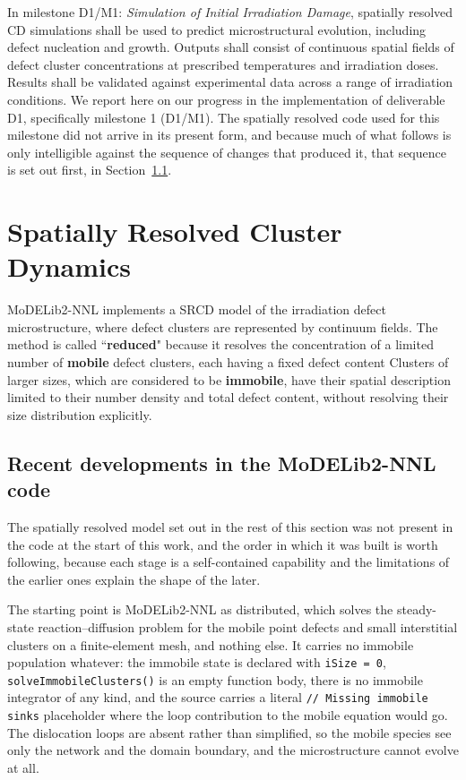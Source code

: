 \documentclass{article}
\newcommand{\MoD}{\textsf{MoDELib2-NNL}}
\begin{document}
In milestone D1/M1: \emph{Simulation of Initial Irradiation Damage}, spatially resolved CD simulations
shall be used to predict microstructural evolution, including defect nucleation and growth.
Outputs shall consist of continuous spatial fields of defect cluster concentrations at prescribed
temperatures and irradiation doses. Results shall be validated against experimental data across a
range of irradiation conditions.
We report here on our progress in the implementation of deliverable D1, specifically milestone 1 (D1/M1). The spatially resolved code used for this milestone did not arrive in its present form, and because much of what follows is only intelligible against the sequence of changes that produced it, that sequence is set out first, in Section~\ref{sec:modelib_history}.


\section{Spatially Resolved Cluster Dynamics}
\label{sec:SRCD}

{\MoD} implements a SRCD model of  the irradiation defect microstructure, where defect clusters are represented by continuum fields. The method is called ``\textbf{reduced}" because it resolves the concentration of a limited number of \textbf{mobile} defect clusters, each having a fixed defect content Clusters of larger sizes, which are considered to be \textbf{immobile}, have their spatial description limited to their number density and total defect content, without resolving their size distribution explicitly.

\subsection{Recent developments in the {\MoD} code}
\label{sec:modelib_history}

The spatially resolved model set out in the rest of this section was not present
in the code at the start of this work, and the order in which it was built is
worth following, because each stage is a self-contained capability and the
limitations of the earlier ones explain the shape of the later.

The starting point is {\MoD} as distributed, which solves the steady-state
reaction--diffusion problem for the mobile point defects and small interstitial
clusters on a finite-element mesh, and nothing else. It carries no immobile
population whatever: the immobile state is declared with \texttt{iSize = 0},
\texttt{solveImmobileClusters()} is an empty function body, there is no immobile
integrator of any kind, and the source carries a literal
\texttt{// Missing immobile sinks} placeholder where the loop contribution to the
mobile equation would go. The dislocation loops are absent rather than simplified,
so the mobile species see only the network and the domain boundary, and the
microstructure cannot evolve at all.
\end{document}
